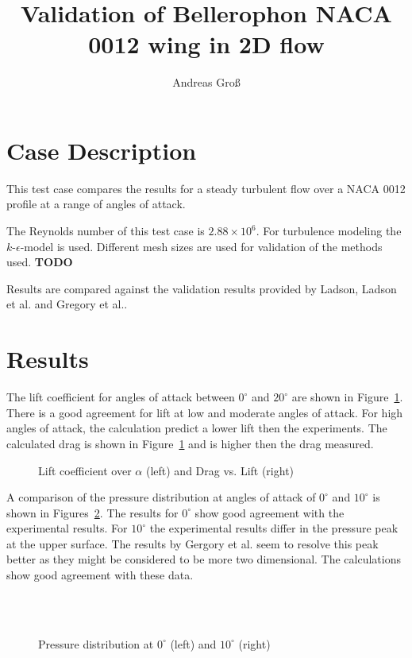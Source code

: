 \documentclass[a4paper,10pt]{scrartcl}
\title{Validation of Bellerophon NACA 0012 wing in 2D flow}
\author{Andreas Groß}
\begin{document}
\maketitle

\section{Case Description}
This test case compares the results for a steady turbulent flow over a NACA 0012
profile at a range of angles of attack. 

The Reynolds number of this test case is \(2.88\times10^6\). For turbulence modeling
the \(k\text{-}\epsilon\)-model is used\cite{kEps}. Different mesh sizes are used for
validation of the methods used. \textbf{TODO}

Results are compared against the validation results provided by Ladson\cite{Ladson1}, Ladson et al.\cite{Ladson2} and
Gregory et al.\cite{Gregory}.

\section{Results}

The lift coefficient for angles of attack between \(0^\circ\) and \(20^\circ\) are
shown in Figure~\ref{Lift}. There is a good agreement for lift at low and moderate angles
of attack. For high angles of attack, the calculation predict a lower lift then the experiments.
The calculated drag is shown in Figure~\ref{Lift} and is higher then the drag measured.
\begin{figure}[!htbp]
  \centering
  \resizebox{0.49\columnwidth}{!}{}
  \resizebox{0.49\columnwidth}{!}{}
  \caption{Lift coefficient over \(\alpha\) (left) and Drag vs. Lift (right)}
  \label{Lift}
\end{figure}

A comparison of the pressure distribution at angles of attack of \(0^\circ\) and \(10^\circ\) is
shown in Figures~\ref{CP}. The results for \(0^\circ\) show good agreement with the experimental
results. For \(10^\circ\) the experimental results differ in the pressure peak at the upper
surface\cite{Gregory}\cite{Ladson2}. The results by Gergory et al. seem to resolve this peak
better as they might be considered to be more two dimensional. The calculations show good agreement
with these data.

\begin{figure}[!htbp]
  \centering
  \resizebox{0.49\columnwidth}{!}{}
  \resizebox{0.49\columnwidth}{!}{} \\
  \resizebox{0.49\columnwidth}{!}{} \\
  \caption{Pressure distribution at \(0^\circ\) (left) and \(10^\circ\) (right)}
  \label{CP}
\end{figure}



\end{document}
